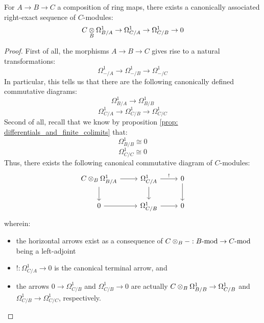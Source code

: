             \begin{proposition} \label{prop: canonical_exact_sequence_of_differentials}
                For $A \to B \to C$ a composition of ring maps, there exists a canonically associated right-exact sequence of $C$-modules:
                    $$C \tensor_B \Omega^1_{B/A} \to \Omega^1_{C/A} \to \Omega^1_{C/B} \to 0$$
            \end{proposition}
                \begin{proof}
                    First of all, the morphisms $A \to B \to C$ gives rise to a natural transformations:
                        $$\Omega^1_{-/A} \to \Omega^1_{-/B} \to \Omega^1_{-/C}$$
                    In particular, this tells us that there are the following canonically defined commutative diagrams:
                        $$\Omega^1_{B/A} \to \Omega^1_{B/B}$$
                        $$\Omega^1_{C/A} \to \Omega^1_{C/B} \to \Omega^1_{C/C}$$
                    Second of all, recall that we know by proposition \ref{prop: differentials_and_finite_colimits} that:
                        $$\Omega^1_{B/B} \cong 0$$
                        $$\Omega^1_{C/C} \cong 0$$
                    Thus, there exists the following canonical commutative diagram of $C$-modules:
                        $$
                            \begin{tikzcd}
                            	{C \tensor_B \Omega^1_{B/A}} & {\Omega^1_{C/A}} & 0 \\
                            	0 & {\Omega^1_{C/B}} & 0
                            	\arrow[from=1-2, to=2-2]
                            	\arrow[from=1-1, to=2-1]
                            	\arrow[from=2-1, to=2-2]
                            	\arrow[from=1-1, to=1-2]
                            	\arrow[from=2-2, to=2-3]
                            	\arrow["{!}", from=1-2, to=1-3]
                            	\arrow[from=1-3, to=2-3]
                            \end{tikzcd}
                        $$
                    wherein:
                        \begin{itemize}
                            \item the horizontal arrows exist as a consequence of $C \tensor_B -: B\mod \to C\mod$ being a left-adjoint
                            \item $!: \Omega^1_{C/A} \to 0$ is the canonical terminal arrow, and
                            \item the arrows $0 \to \Omega^1_{C/B}$ and $\Omega^1_{C/B} \to 0$ are actually $C \tensor_B \Omega^1_{B/B} \to \Omega^1_{C/B}$ and $\Omega^1_{C/B} \to \Omega^1_{C/C}$, respectively.

\end{itemize}
\end{proof}
